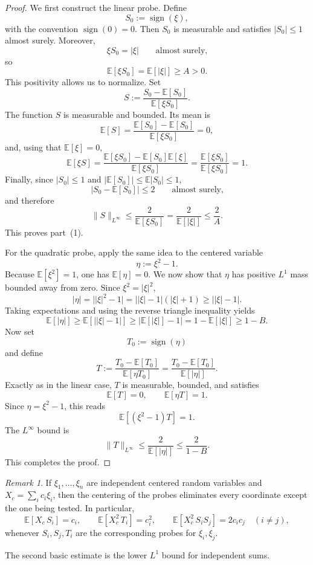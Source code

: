\documentclass[11pt]{amsart}
\numberwithin{equation}{section}
\theoremstyle{definition}
\theoremstyle{remark}
\newtheorem{remark}[theorem]{Remark}
\newcommand{\E}{\mathbb E}
\newcommand{\sgn}{\operatorname{sign}}
\newcommand{\abs}[1]{\lvert #1 \rvert}
\newcommand{\norm}[1]{\lVert #1 \rVert}
\begin{document}
\begin{proof}
We first construct the linear probe.  Define
\[
S_0:=\sgn(\xi),
\]
with the convention $\sgn(0)=0$.  Then $S_0$ is measurable and satisfies
$|S_0|\le 1$ almost surely.  Moreover,
\[
\xi S_0=\abs{\xi}
\qquad\text{almost surely,}
\]
so
\[
\E[\xi S_0]=\E[\abs{\xi}]\ge A>0.
\]
This positivity allows us to normalize.  Set
\[
S:=\frac{S_0-\E[S_0]}{\E[\xi S_0]}.
\]
The function $S$ is measurable and bounded.  Its mean is
\[
\E[S]=\frac{\E[S_0]-\E[S_0]}{\E[\xi S_0]}=0,
\]
and, using that $\E[\xi]=0$,
\[
\E[\xi S]
=\frac{\E[\xi S_0]-\E[S_0]\E[\xi]}{\E[\xi S_0]}
=\frac{\E[\xi S_0]}{\E[\xi S_0]}
=1.
\]
Finally, since $|S_0|\le1$ and $|\E[S_0]|\le \E|S_0|\le1$,
\[
|S_0-\E[S_0]|\le 2
\qquad\text{almost surely,}
\]
and therefore
\[
\norm{S}_{L^\infty}
\le \frac{2}{\E[\xi S_0]}
=\frac{2}{\E[\abs{\xi}]}
\le \frac{2}{A}.
\]
This proves part~\rm(1).

For the quadratic probe, apply the same idea to the centered variable
\[
\eta:=\xi^2-1.
\]
Because $\E[\xi^2]=1$, one has $\E[\eta]=0$.  We now show that $\eta$ has
positive $L^1$ mass bounded away from zero.  Since $\xi^2=\abs{\xi}^2$,
\[
\abs{\eta}
=\abs{\abs{\xi}^2-1}
=\abs{\abs{\xi}-1}(\abs{\xi}+1)
\ge \abs{\abs{\xi}-1}.
\]
Taking expectations and using the reverse triangle inequality yields
\[
\E[\abs{\eta}]
\ge \E[\abs{\abs{\xi}-1}]
\ge \bigl|\E[\abs{\xi}]-1\bigr|
=1-\E[\abs{\xi}]
\ge 1-B.
\]
Now set
\[
T_0:=\sgn(\eta)
\]
and define
\[
T:=\frac{T_0-\E[T_0]}{\E[\eta T_0]}
=\frac{T_0-\E[T_0]}{\E[\abs{\eta}]}.
\]
Exactly as in the linear case, $T$ is measurable, bounded, and satisfies
\[
\E[T]=0,
\qquad
\E[\eta T]=1.
\]
Since $\eta=\xi^2-1$, this reads
\[
\E[(\xi^2-1)T]=1.
\]
The $L^\infty$ bound is
\[
\norm{T}_{L^\infty}
\le \frac{2}{\E[\abs{\eta}]}
\le \frac{2}{1-B}.
\]
This completes the proof.
\end{proof}

\begin{remark}\label{rem:probe-extraction}
If $\xi_1,\dots,\xi_n$ are independent centered random variables and
$X_c=\sum_i c_i\xi_i$, then the centering of the probes eliminates every
coordinate except the one being tested.  In particular,
\[
\E[X_c\,S_i]=c_i,
\qquad
\E[X_c^2\,T_i]=c_i^2,
\qquad
\E[X_c^2\,S_iS_j]=2c_ic_j
\quad(i\ne j),
\]
whenever $S_i,S_j,T_i$ are the corresponding probes for $\xi_i,\xi_j$.
\end{remark}

The second basic estimate is the lower $L^1$ bound for independent sums.
\end{document}
